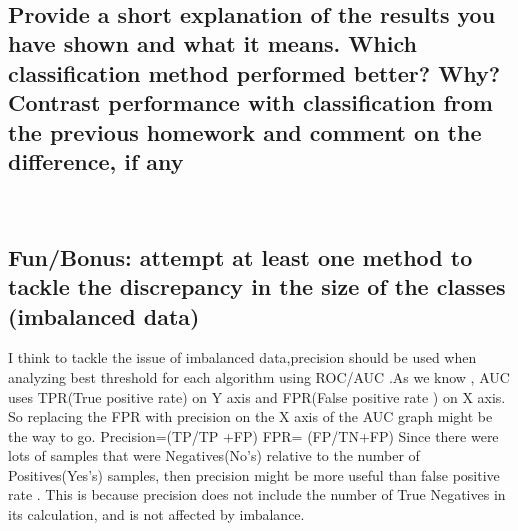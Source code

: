 \\

\subsection{Provide a short explanation of the results you have shown and what it means. Which classification method performed better? Why? Contrast performance with classification from the previous homework and comment on the difference, if any}


\\

\subsection{ Fun/Bonus: attempt at least one method to tackle the discrepancy in the size of the classes (imbalanced data)}
 I think to tackle the issue of imbalanced data,precision should be used when analyzing best threshold for each algorithm using ROC/AUC .As we know , AUC uses TPR(True positive rate) on Y axis and FPR(False positive rate ) on X axis. So replacing the FPR with precision on the X axis of the AUC graph might be the way to go.
 Precision=(TP/TP +FP) FPR= (FP/TN+FP)
 Since there were lots of samples that were Negatives(No's) relative to the number of Positives(Yes's) samples, then precision might be more useful than false positive rate . This is because precision does not include the number of True Negatives in its calculation, and is not affected by imbalance.



